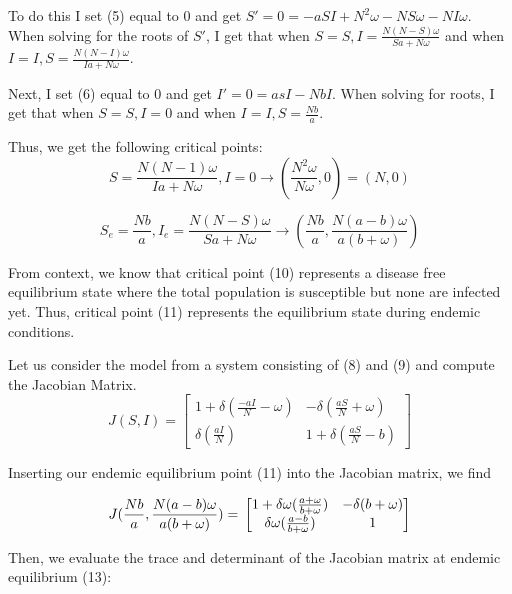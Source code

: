 \documentclass[%
 reprint,
]{revtex4-2}
\begin{document}
To do this I set (5) equal to 0 and get $S'=0=-aSI + N^2\omega - NS\omega - NI\omega$.
When solving for the roots of $S'$, I get that when $S=S, I=\frac{N(N-S)\omega}{Sa+N\omega}$ and when $I=I, S=\frac{N(N-I)\omega}{Ia+N\omega}$.

Next, I set (6) equal to 0 and get $I'=0=asI-NbI$. When solving for roots, I get that when $S=S, I=0$ and when $I=I, S=\frac{Nb}{a}$.

Thus, we get the following critical points:
\begin{equation} S=\frac{N(N-1)\omega}{Ia+N\omega}, I=0 \rightarrow (\frac{N^2\omega}{N\omega},0) = (N,0)  \end{equation}

\begin{equation} \label{eqn:CP2} S_e=\frac{Nb}{a}, I_e=\frac{N(N-S)\omega}{Sa+N\omega} \rightarrow (\frac{Nb}{a},\frac{N(a-b)\omega}{a(b+\omega)}) \end{equation}

From context, we know that critical point (10) represents a disease free equilibrium state where the total population is susceptible but none are infected yet. Thus, critical point (11) represents the equilibrium state during endemic conditions.

Let us consider the model from a system consisting of (8) and (9) and compute the Jacobian Matrix. \\
\begin{equation}
J(S,I) = \begin{bmatrix} 
1+\delta(\frac{-aI}{N}-\omega) & -\delta(\frac{aS}{N}+\omega) \\
\delta(\frac{aI}{N}) & 1+\delta(\frac{aS}{N}-b) \end{bmatrix}
\end{equation}

Inserting our endemic equilibrium point (11) into the Jacobian matrix, we find

\begin{equation}
J(\frac{Nb}{a},\frac{N(a-b)\omega}{a(b+\omega)}) = \\ \begin{bmatrix} 
1+\delta\omega(\frac{a+\omega}{b+\omega}) & -\delta(b+\omega) \\
\delta\omega(\frac{a-b}{b+\omega}) & 1 \end{bmatrix}
\end{equation}

Then, we evaluate the trace and determinant of the Jacobian matrix at endemic equilibrium (13): \\
\end{document}
